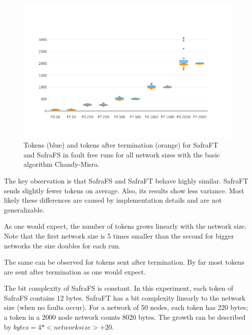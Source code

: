 \begin{figure}
	\includegraphics{figures/tokens-and-tokens-after-cm.png}
	\caption{Tokens (blue) and tokens after termination (orange) for SafraFT and SafraFS in fault free runs for all network sizes with the basic algorithm Chandy-Misra.}
	\label{fig:tokens-and-tokens-after-cm}
\end{figure}



The key observation is that SafraFS and SafraFT behave highly similar.
SafraFT sends slightly fewer tokens on average.
Also, its results show less variance.
Most likely these differences are caused by implementation details and are not generalizable.

As one would expect, the number of tokens grows linearly with the network size.
Note that the first network size is 5 times smaller than the second for bigger networks the size doubles for each run.

The same can be observed for tokens sent after termination.
By far most tokens are sent after termination as one would expect.

The bit complexity of SafraFS is constant.
In this experiment, each token of SafraFS contains 12 bytes.
SafraFT has a bit complexity linearly to the network size (when no faults occur).
For a network of 50 nodes, each token has 220 bytes; a token in a 2000 node network counts 8020 bytes.
The growth can be described by $bytes = 4 * <network size> + 20$.

